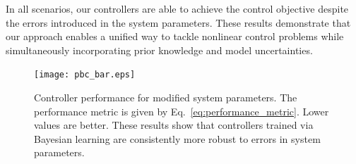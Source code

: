 In all scenarios, our controllers are able to achieve the control objective
despite the errors introduced in the system parameters.
%
%
These results demonstrate that our approach enables a unified way to tackle
nonlinear control problems while simultaneously incorporating prior knowledge
and model uncertainties.
%
\begin{figure}[t]
    \centering
    \texttt{[image: pbc\_bar.eps]}
    \caption{
        Controller performance for modified system parameters. 
        The performance metric is given by
        Eq.~\eqref{eq:performance_metric}.
        Lower values are better. 
        These results show that controllers trained via Bayesian learning are
        consistently more robust to errors in system parameters.
    }
    \label{fig:neuralpbc_bar_plot}
\end{figure}



